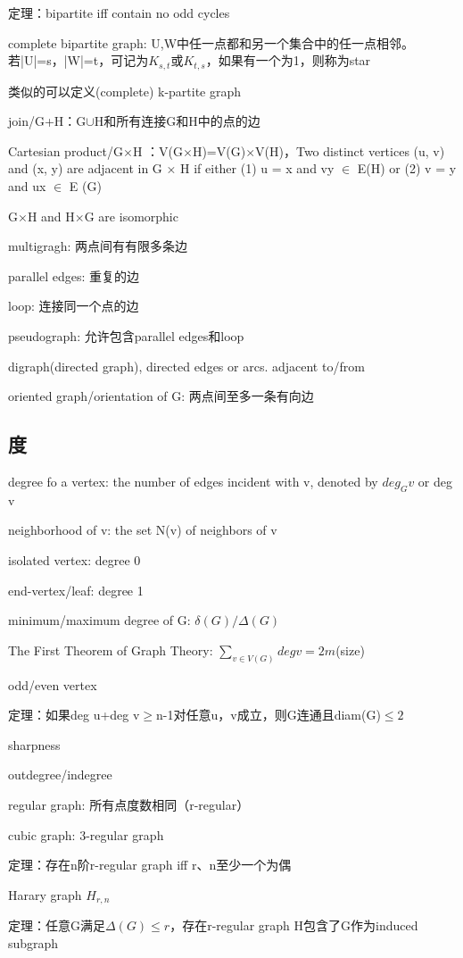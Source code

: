 \documentclass[cn,hazy,blue,screen,14pt]{note}
\begin{document}
定理：bipartite iff contain no odd cycles

complete bipartite graph: U,W中任一点都和另一个集合中的任一点相邻。若|U|=s，|W|=t，可记为$K_{s,t}$或$K_{t,s}$，如果有一个为1，则称为star

类似的可以定义(complete) k-partite graph

join/G+H：G$\cup$H和所有连接G和H中的点的边

Cartesian product/G$\times$H ：V(G$\times$H)=V(G)$\times$V(H)，Two distinct vertices (u, v) and (x,
y) are adjacent in G × H if either (1) u = x and vy $\in$ E(H) or (2) v = y and ux $\in$ E (G)

G$\times$H and H$\times$G are isomorphic

multigragh: 两点间有有限多条边

parallel edges: 重复的边

loop: 连接同一个点的边

pseudograph: 允许包含parallel edges和loop

digraph(directed graph), directed edges or arcs. adjacent to/from

oriented graph/orientation of G: 两点间至多一条有向边

\subsection{度}
degree fo a vertex: the number of edges incident with v, denoted by $deg_{G} v$ or deg v

neighborhood of v: the set N(v) of neighbors of v

isolated vertex: degree 0

end-vertex/leaf: degree 1

minimum/maximum degree of G: $\delta(G)/\Delta(G)$

The First Theorem of Graph Theory: $\sum _{v\in V(G)} deg v=2m$(size)

odd/even vertex

定理：如果deg u+deg v$\geq$n-1对任意u，v成立，则G连通且diam(G)$\leq 2$

sharpness

outdegree/indegree

regular graph: 所有点度数相同（r-regular）

cubic graph: 3-regular graph

定理：存在n阶r-regular graph iff r、n至少一个为偶

Harary graph $H_{r,n}$

定理：任意G满足$\Delta(G)\leq r$，存在r-regular graph H包含了G作为induced subgraph
\end{document}
